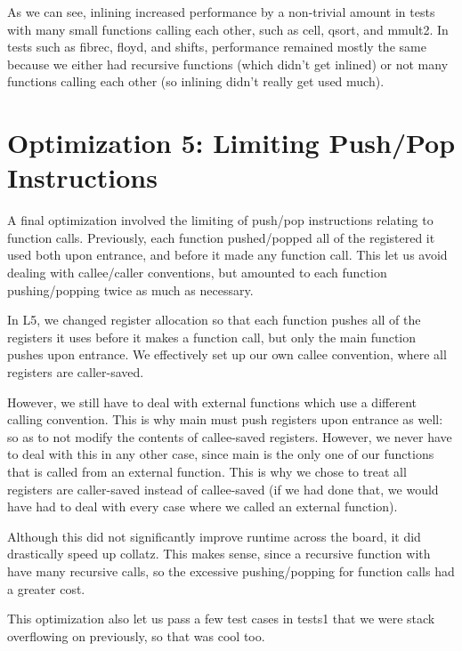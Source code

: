 \documentclass{article}
\begin{document}
As we can see, inlining increased performance by a non-trivial amount in tests with many small functions calling each other, such as cell, qsort, and mmult2. In tests such as fibrec, floyd, and shifts, performance remained mostly the same because we either had recursive functions (which didn't get inlined) or not many functions calling each other (so inlining didn't really get used much). 

\section{Optimization 5: Limiting Push/Pop Instructions}

A final optimization involved the limiting of push/pop instructions relating to function calls. Previously, each function pushed/popped all of the registered it used both upon entrance, and before it made any function call. This let us avoid dealing with callee/caller conventions, but amounted to each function pushing/popping twice as much as necessary.

In L5, we changed register allocation so that each function pushes all of the registers it uses before it makes a function call, but only the main function pushes upon entrance. We effectively set up our own callee convention, where all registers are caller-saved.

However, we still have to deal with external functions which use a different calling convention. This is why main must push registers upon entrance as well: so as to not modify the contents of callee-saved registers. However, we never have to deal with this in any other case, since main is the only one of our functions that is called from an external function. This is why we chose to treat all registers are caller-saved instead of callee-saved (if we had done that, we would have had to deal with every case where we called an external function).

Although this did not significantly improve runtime across the board, it did drastically speed up collatz. This makes sense, since a recursive function with have many recursive calls, so the excessive pushing/popping for function calls had a greater cost.

This optimization also let us pass a few test cases in tests1 that we were stack overflowing on previously, so that was cool too.
\end{document}
